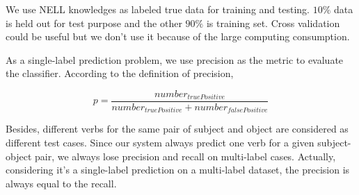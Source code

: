We use NELL knowledges as labeled true data for training and testing. $10\%$ data is held out for test purpose and the other $90\%$ is training set. Cross validation could be useful but we don't use it because of the large computing consumption.

As a single-label prediction problem, we use precision as the metric to evaluate the classifier. According to the definition of precision,

\begin{equation}
	p = \frac{number_{truePositive}}{number_{truePositive} + number_{falsePositive}}
\end{equation}

Besides, different verbs for the same pair of subject and object are considered as different test cases. Since our system always predict one verb for a given subject-object pair, we always lose precision and recall on multi-label cases. Actually, considering it's a single-label prediction on a multi-label dataset, the precision is always equal to the recall.




